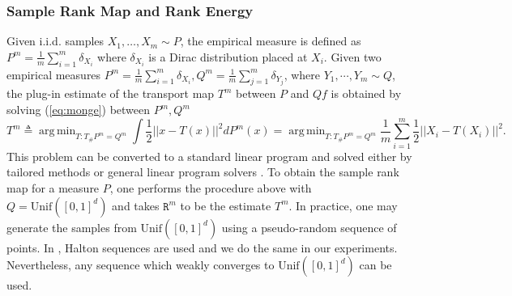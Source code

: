 \documentclass{article}
\theoremstyle{definition}
\DeclareMathOperator*{\argmin}{arg\,min}
\begin{document}
\subsubsection{Sample Rank Map and Rank Energy}\label{subsubsec:sample_rank}
Given i.i.d. samples  $X_1, \dots,  X_m \sim P$, the empirical measure is defined as $P^m = \frac{1}{m}\sum_{i=1}^m \delta_{X_i}$ where $\delta_{X_i}$ is a Dirac distribution placed at $X_i$. Given two empirical measures $P^m = \frac{1}{m}\sum_{i=1}^m \delta_{X_i}, Q^m = \frac{1}{m}\sum_{j=1}^m \delta_{Y_j}$, where $Y_1, \cdots, Y_m\sim Q$, the plug-in estimate of the transport map $T^m$ between $P$ and $Qf$ is obtained by solving (\ref{eq:monge}) between $P^m, Q^m$ 
\begin{equation} \label{eq:OT_comb}
    T^m \triangleq \argmin_{T: T_\#P^m = Q^m} \int \frac{1}{2}||x - T(x)||^2 dP^m(x) = \argmin_{T: T_\#P^m = Q^m} \frac{1}{m} \sum_{i=1}^m \frac{1}{2} ||X_i - T(X_i)||^2.
\end{equation}
This problem can be converted to a standard linear program and solved either by tailored methods or general linear program solvers \cite{peyre2019computational}. To obtain the sample rank map for a measure $P$, one performs the procedure above with $Q = \text{Unif}([0,1]^d)$ and takes $\mathtt{R}^m$ to be the estimate $T^m$.  In practice, one may generate the samples from $\text{Unif}([0,1]^d)$ using a pseudo-random sequence of points. In \cite{deb2021multivariate}, Halton sequences \cite{hofer2009distribution} are used and we do the same in our experiments. Nevertheless, any sequence which weakly converges to $\text{Unif}([0,1]^d)$ can be used. 
\end{document}
